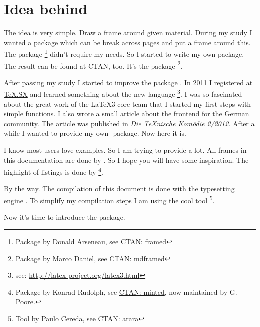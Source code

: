 \documentclass[openany,12pt,tocdepth=3]{ltx-md}
\begin{document}
\chapter{Idea behind \texorpdfstring{}{xframed}}\label{chap:idea}

The idea is very simple. Draw a frame around given material. During my study 
I wanted a package which can be break across pages and put a frame around this.
The package \footnote{Package  by Don­ald Arse­neau, 
see \href{http://www.ctan.org/pkg/framed}{CTAN: framed}} didn't require my needs.
So I started to write my own package. The result can be found at CTAN, too. It's the
package \footnote{Package  by Marco Daniel, 
see \href{http://www.ctan.org/pkg/mdframed}{CTAN: mdframed}}.

After passing my study I started to improve the package . In 2011 
I registered at \href{http://tex.stackexchange.com/}{TeX.SX}  and learned something
about the new language \footnote{see: 
\href{http://latex-project.org/latex3.html}{http://latex-project.org/latex3.html}}. 
I was so fascinated about the great work of the \LaTeX3 core team that I started 
my first steps with simple functions. I also wrote a small article about the 
frontend  for the German community. The article was published
in   \emph{Die \TeX nische Komödie 2/2012}. 
After a while I wanted to provide my own -package. Now here it is.

I know most users love examples. So I am trying to provide a lot. All
frames in this documentation are done by . So I hope
you will have some inspiration. The highlight of listings is done
by \footnote{Package  by Kon­rad Ru­dolph, 
see \href{http://www.ctan.org/pkg/minted}{CTAN: minted}, now maintained by G. Poore.}.

\vfill
By the way. The compilation of this document is done with the
typesetting engine \LuaLaTeX. To simplify my compilation steps
I am using the cool tool \footnote{Tool  by Paulo Cereda, 
see \href{http://www.ctan.org/pkg/arara}{CTAN: arara}}.

\vfill
Now it's time to introduce the package.


\end{document}
